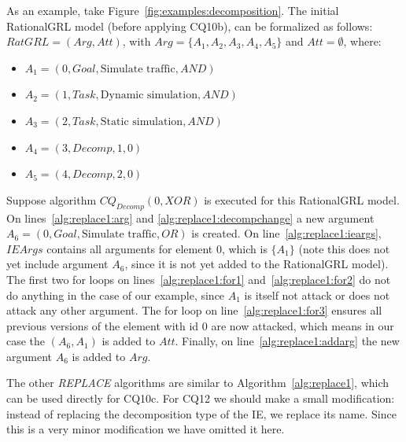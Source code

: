 As an example, take Figure~\ref{fig:examples:decomposition}. The initial RationalGRL model (before applying CQ10b), can be formalized as follows: $RatGRL=(Arg,Att)$, with $Arg=\{A_1,A_2,A_3,A_4,A_5\}$ and $Att=\emptyset$, where:
\begin{itemize}
\item $A_1=(0,Goal,\text{Simulate traffic},AND)$
\item $A_2=(1,Task,\text{Dynamic simulation},AND)$
\item $A_3=(2,Task,\text{Static simulation},AND)$
\item $A_4=(3,Decomp,1,0)$
\item $A_5=(4,Decomp,2,0)$
\end{itemize}

Suppose algorithm $CQ_{Decomp}(0, XOR)$ is executed for this RationalGRL model. On lines~\ref{alg:replace1:arg} and \ref{alg:replace1:decompchange} a new argument $A_6=(0,Goal,\text{Simulate traffic},OR)$ is created. On line~\ref{alg:replace1:ieargs}, $IEArgs$ contains all arguments for element 0, which is $\{A_1\}$ (note this does not yet include argument $A_6$, since it is not yet added to the RationalGRL model). The first two for loops on lines~\ref{alg:replace1:for1} and~\ref{alg:replace1:for2} do not do anything in the case of our example, since $A_1$ is itself not attack or does not attack any other argument. The for loop on line~\ref{alg:replace1:for3} ensures all previous versions of the element with id 0 are now attacked, which means in our case the $(A_6,A_1)$ is added to $Att$. Finally, on line~\ref{alg:replace1:addarg} the new argument $A_6$ is added to $Arg$.

The other \emph{REPLACE} algorithms are similar to Algorithm~\ref{alg:replace1}, which can be used directly for CQ10c. For CQ12 we should make a small modification: instead of replacing the decomposition type of the IE, we replace its name. Since this is a very minor modification we have omitted it here.